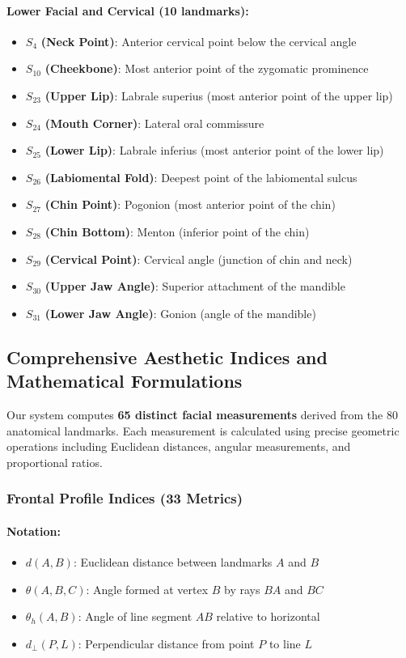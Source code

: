 \paragraph{Lower Facial and Cervical (10 landmarks):}
\begin{itemize}
    \item $S_4$ \textbf{(Neck Point)}: Anterior cervical point below the cervical angle
    \item $S_{10}$ \textbf{(Cheekbone)}: Most anterior point of the zygomatic prominence
    \item $S_{23}$ \textbf{(Upper Lip)}: Labrale superius (most anterior point of the upper lip)
    \item $S_{24}$ \textbf{(Mouth Corner)}: Lateral oral commissure
    \item $S_{25}$ \textbf{(Lower Lip)}: Labrale inferius (most anterior point of the lower lip)
    \item $S_{26}$ \textbf{(Labiomental Fold)}: Deepest point of the labiomental sulcus
    \item $S_{27}$ \textbf{(Chin Point)}: Pogonion (most anterior point of the chin)
    \item $S_{28}$ \textbf{(Chin Bottom)}: Menton (inferior point of the chin)
    \item $S_{29}$ \textbf{(Cervical Point)}: Cervical angle (junction of chin and neck)
    \item $S_{30}$ \textbf{(Upper Jaw Angle)}: Superior attachment of the mandible
    \item $S_{31}$ \textbf{(Lower Jaw Angle)}: Gonion (angle of the mandible)
\end{itemize}

\subsection{Comprehensive Aesthetic Indices and Mathematical Formulations}

Our system computes \textbf{65 distinct facial measurements} derived from the 80 anatomical landmarks. Each measurement is calculated using precise geometric operations including Euclidean distances, angular measurements, and proportional ratios.

\subsubsection{Frontal Profile Indices (33 Metrics)}

\paragraph{Notation:}
\begin{itemize}
    \item $d(A, B)$: Euclidean distance between landmarks $A$ and $B$
    \item $\theta(A, B, C)$: Angle formed at vertex $B$ by rays $BA$ and $BC$
    \item $\theta_h(A, B)$: Angle of line segment $AB$ relative to horizontal
    \item $d_\perp(P, L)$: Perpendicular distance from point $P$ to line $L$
\end{itemize}

